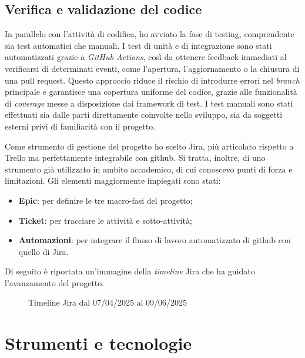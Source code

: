 \subsection{Verifica e validazione del codice}

\par In parallelo con l’attività di codifica, ho avviato la fase di testing, comprendente sia test automatici che manuali. I test di unità e di integrazione sono stati automatizzati grazie a \textit{GitHub Actions}, così da ottenere feedback immediati al verificarsi di determinati eventi, come l’apertura, l’aggiornamento o la chiusura di una \gls{pull request}. Questo approccio riduce il rischio di introdurre errori nel \textit{branch} principale e garantisce una copertura uniforme del codice, grazie alle funzionalità di \textit{coverage} messe a disposizione dai \gls{framework} di test. I test manuali sono stati effettuati sia dalle parti direttamente coinvolte nello sviluppo, sia da soggetti esterni privi di familiarità con il progetto.

\vspace{10pt}
\par\noindent Come strumento di gestione del progetto ho scelto Jira, più articolato rispetto a Trello ma perfettamente integrabile con \gls{github}. Si tratta, inoltre, di uno strumento già utilizzato in ambito accademico, di cui conoscevo punti di forza e limitazioni. Gli elementi maggiormente impiegati sono stati:
\begin{itemize}
  \item \textbf{Epic}: per definire le tre macro-fasi del progetto;
  \item \textbf{Ticket}: per tracciare le attività e sotto-attività;
  \item \textbf{Automazioni}: per integrare il flusso di lavoro automatizzato di \gls{github} con quello di Jira.
\end{itemize}

\vspace{5pt}
\par\noindent Di seguito è riportata un’immagine della \textit{timeline} Jira che ha guidato l’avanzamento del progetto.

\begin{figure}[H]
  \centering 
  \caption{Timeline Jira dal 07/04/2025 al 09/06/2025}
\end{figure}

\section{Strumenti e tecnologie}
\label{sec:strumenti-tecnologie}

